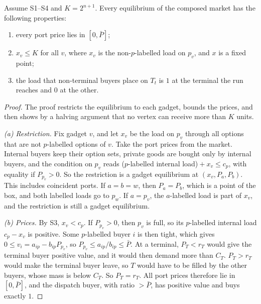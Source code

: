 \begin{theorem}[Composition]\label{thm:compose}
\statusrefereed
Assume S1--S4 and $K=2^{n+1}$. Every equilibrium of the composed market has the following properties:
\begin{enumerate}[nosep]
\item every port price lies in $[0,\bar P]$;
\item $x_v\le K$ for all $v$, where $x_v$ is the non-$p$-labelled load on $p_v$, and $x$ is a fixed
point;
\item the load that non-terminal buyers place on $T_t$ is $1$ at the terminal the run reaches and $0$ at
the other.
\end{enumerate}
\end{theorem}

\begin{proof}
The proof restricts the equilibrium to each gadget, bounds the prices, and then shows by a halving
argument that no vertex can receive more than $K$ units.

\emph{(a) Restriction.} Fix gadget $v$, and let $x_v$ be the load on $p_v$ through all options that are
not $p$-labelled options of $v$. Take the port prices from the market. Internal buyers keep their option
sets, private goods are bought only by internal buyers, and the condition on $p_v$ reads ($p$-labelled
internal load)${}+x_v\le c_p$, with equality if $P_{p_v}>0$. So the restriction is a gadget equilibrium
at $(x_v,P_a,P_b)$. This includes coincident ports. If $a=b=w$, then $P_a=P_b$, which is a point of the
box, and both labelled loads go to $p_w$. If $a=p_v$, the $a$-labelled load is part of $x_v$, and the
restriction is still a gadget equilibrium.

\emph{(b) Prices.} By S3, $x_v<c_p$. If $P_{p_v}>0$, then $p_v$ is full, so its $p$-labelled internal
load $c_p-x_v$ is positive. Some $p$-labelled buyer $i$ is then tight, which gives
$0\le v_i=a_{ip}-b_{ip}P_{p_v}$, so $P_{p_v}\le a_{ip}/b_{ip}\le\bar P$. At a terminal, $P_T<r_T$ would
give the terminal buyer positive value, and it would then demand more than $C_T$. $P_T>r_T$ would make
the terminal buyer leave, so $T$ would have to be filled by the other buyers, whose mass is below $C_T$.
So $P_T=r_T$. All port prices therefore lie in $[0,\bar P]$, and the dispatch buyer, with ratio
$>\bar P$, has positive value and buys exactly $1$.


\end{proof}
